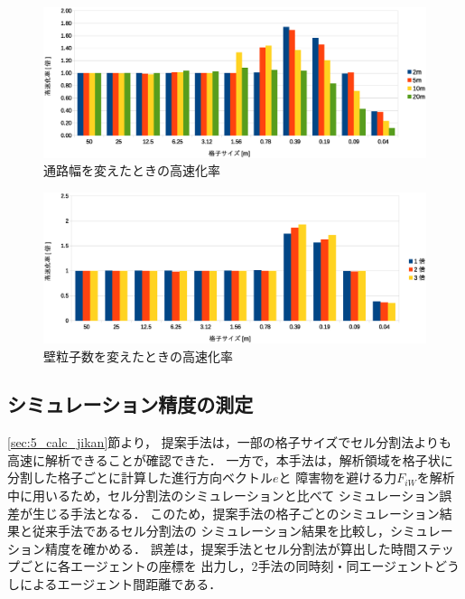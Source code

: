 \begin{figure}[tb]
 \begin{center}
  \includegraphics[width=\columnwidth]{figure/5_kousokukaritu.eps}
  \caption{通路幅を変えたときの高速化率}
  \label{fig:5_kousokuka_haba}
 \end{center}
\end{figure}

\begin{figure}[tb]
 \begin{center}
  \includegraphics[width=\columnwidth]{figure/5_bai_kousokukaritu.eps}
  \caption{壁粒子数を変えたときの高速化率}
  \label{fig:5_kousokuka_atusa}
 \end{center}
\end{figure}



\clearpage
\subsection{シミュレーション精度の測定}
\ref{sec:5_calc_jikan}節より，
提案手法は，一部の格子サイズでセル分割法よりも高速に解析できることが確認できた．
一方で，本手法は，解析領域を格子状に分割した格子ごとに計算した進行方向ベクトル$e$と
障害物を避ける力$F_{iW}$を解析中に用いるため，セル分割法のシミュレーションと比べて
シミュレーション誤差が生じる手法となる．
このため，提案手法の格子ごとのシミュレーション結果と従来手法であるセル分割法の
シミュレーション結果を比較し，シミュレーション精度を確かめる．
誤差は，提案手法とセル分割法が算出した時間ステップごとに各エージェントの座標を
出力し，2手法の同時刻・同エージェントどうしによるエージェント間距離である．

